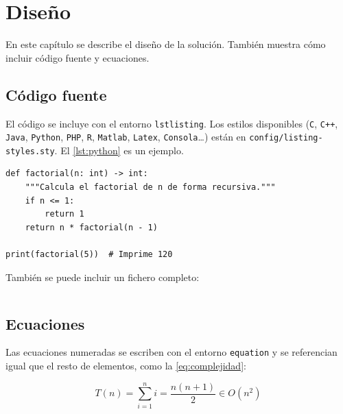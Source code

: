 
\chapter{Diseño}
\label{cap:diseno}

En este capítulo se describe el diseño de la solución. También muestra cómo incluir código fuente y ecuaciones.

\section{Código fuente}

El código se incluye con el entorno \texttt{lstlisting}. Los estilos disponibles (\texttt{C}, \texttt{C++}, \texttt{Java}, \texttt{Python}, \texttt{PHP}, \texttt{R}, \texttt{Matlab}, \texttt{Latex}, \texttt{Consola}\ldots) están en \texttt{config/listing-styles.sty}. El \cref{lst:python} es un ejemplo.

\begin{lstlisting}[style=Python, caption={Ejemplo de código en Python.}, label={lst:python}]
def factorial(n: int) -> int:
    """Calcula el factorial de n de forma recursiva."""
    if n <= 1:
        return 1
    return n * factorial(n - 1)

print(factorial(5))  # Imprime 120
\end{lstlisting}

También se puede incluir un fichero completo:

\begin{lstlisting}[style=Latex]

\end{lstlisting}

\section{Ecuaciones}

Las ecuaciones numeradas se escriben con el entorno \texttt{equation} y se referencian igual que el resto de elementos, como la \cref{eq:complejidad}:

\begin{equation}
  T(n) = \sum_{i=1}^{n} i = \frac{n(n+1)}{2} \in O(n^2)
  \label{eq:complejidad}
\end{equation}
